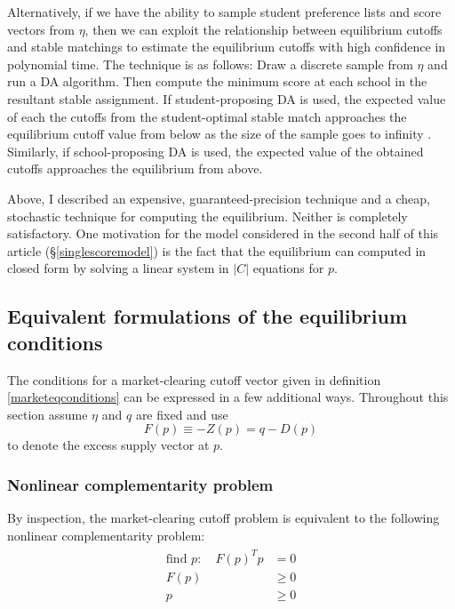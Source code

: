 \documentclass[12pt]{article}
\theoremstyle{definition}
\begin{document}
Alternatively, if we have the ability to sample student preference lists and score vectors from $\eta$, then we can exploit the relationship between equilibrium cutoffs and stable matchings to estimate the equilibrium cutoffs with high confidence in polynomial time. The technique is as follows: Draw a discrete sample from $\eta$ and run a DA algorithm. Then compute the minimum score at each school in the resultant stable assignment. If student-proposing DA is used, the expected value of each the cutoffs from the student-optimal stable match approaches the equilibrium cutoff value from below as the size of the sample goes to infinity \parencite[][]{supplydemandfw}. Similarly, if school-proposing DA is used, the expected value of the obtained cutoffs approaches the equilibrium from above. 

Above, I described an expensive, guaranteed-precision technique and a cheap, stochastic technique for computing the equilibrium. Neither is completely satisfactory. One motivation for the model considered in the second half of this article (\S\ref{singlescoremodel}) is the fact that the equilibrium can computed in closed form by solving a linear system in $|C|$ equations for $p$.

\subsection{Equivalent formulations of the equilibrium conditions}
The conditions for a market-clearing cutoff vector given in definition \ref{marketeqconditions} can be expressed in a few additional ways. Throughout this section assume $\eta$ and $q$ are fixed and use \[F(p) \equiv -Z(p) = q - D(p)\]
to denote the excess supply vector at $p$. 

\subsubsection{Nonlinear complementarity problem}
By inspection, the market-clearing cutoff problem is equivalent to the following nonlinear complementarity problem:
\begin{gather} \label{nonlinearcompprob}
\begin{aligned}
\text{find } p:\quad F(p)^T p & = 0 \\ F(p) &\geq 0 \\ p & \geq 0
\end{aligned}
\end{gather}
\end{document}
